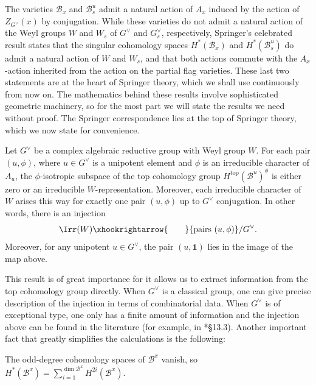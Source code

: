 The varieties $\mathcal{B}_x$ and $\mathcal{B}_s^u$ admit a natural action of $A_x$ induced by the action of $Z_{G^\vee}(x)$ by conjugation. While these varieties do not admit a natural action of the Weyl groups $W$ and $W_s$ of $G^\vee$ and $G^\vee_s$, respectively, Springer's celebrated result states that the singular cohomology spaces $H^*(\mathcal{B}_x)$ and $H^*(\mathcal{B}_s^u)$ do admit a natural action of $W$ and $W_s$, and that both actions commute with the $A_x$-action inherited from the action on the partial flag varieties. These last two statements are at the heart of Springer theory, which we shall use continuously from now on. The mathematics behind these results involve sophisticated geometric machinery, so for the most part we will state the results we need without proof. The Springer correspondence lies at the top of Springer theory, which we now state for convenience. 

\begin{theorem}
    Let $G^\vee$ be a complex algebraic reductive group with Weyl group $W$. For each pair $(u,\phi)$, where $u\in G^\vee$ is a unipotent element and $\phi$ is an irreducible character of $A_u$, the $\phi$-isotropic subspace of the top cohomology group $H^{\mathrm{top}}(\mathcal{B}^u)^\phi$ is either zero or an irreducible $W$-representation. Moreover, each irreducible character of $W$ arises this way for exactly one pair $(u,\phi)$ up to $G^\vee$ conjugation. In other words, there is an injection
    $$\Irr(W)\xhookrightarrow{\quad\quad}\{\textrm{pairs }(u,\phi)\}/G^\vee.$$
    Moreover, for any unipotent $u\in G^\vee$, the pair $(u,\mathbf{1})$ lies in the image of the map above.
\end{theorem}
This result is of great importance for it allows us to extract information from the top cohomology group directly. When $G^\vee$ is a classical group, one can give precise description of the injection in terms of combinatorial data. When $G^\vee$ is of exceptional type, one only has a finite amount of information and the injection above can be found in the literature (for example, in \cite{Carter1985}*{\S 13.3}). Another important fact that greatly simplifies the calculations is the following:

\begin{theorem}\label{thm:odd_vanish}
    The odd-degree cohomology spaces of $\mathcal{B}^x$ vanish, so $H^*(\mathcal{B}^x)=\sum_{i=1}^{\dim\mathcal{B}^x}H^{2i}(\mathcal{B}^x)$.
\end{theorem}

